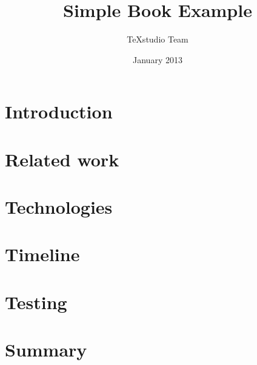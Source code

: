 \documentclass{report}
\begin{document}
	
	\author{TeXstudio Team}
	\title{Simple Book Example}
	\date{January 2013}
	
	
	\maketitle
	\tableofcontents
	
%	
%	
%
	
	\chapter{Introduction}
	
	
	\chapter{Related work}
	
	
	\chapter{Technologies}
	
	
	\chapter{Timeline}
	
	
	\chapter{Testing}
	
	
	\chapter{Summary}
	
	
	
\end{document}
